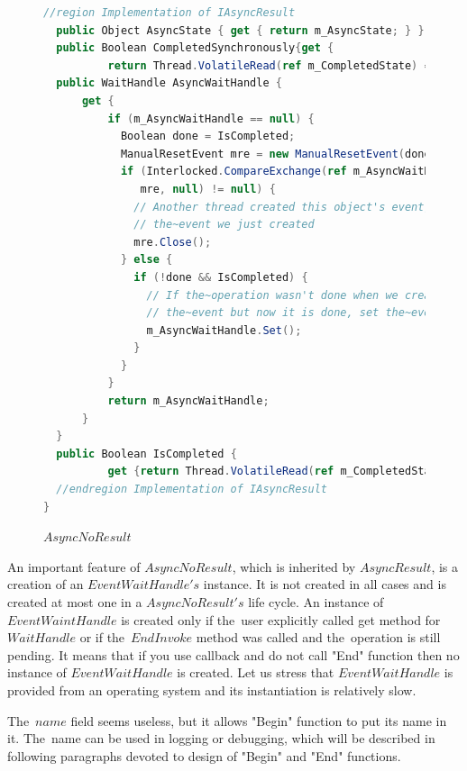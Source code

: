 \begin{figure}[!hbp]
\begin{lstlisting}[language=cs]
  //region Implementation of IAsyncResult
  public Object AsyncState { get { return m_AsyncState; } }
  public Boolean CompletedSynchronously{get { 
          return Thread.VolatileRead(ref m_CompletedState) ==  ic_scs; }}
  public WaitHandle AsyncWaitHandle {
      get {
          if (m_AsyncWaitHandle == null) {
            Boolean done = IsCompleted;
            ManualResetEvent mre = new ManualResetEvent(done);
            if (Interlocked.CompareExchange(ref m_AsyncWaitHandle,
               mre, null) != null) {
              // Another thread created this object's event; dispose 
              // the~event we just created
              mre.Close();
            } else {
              if (!done && IsCompleted) {
                // If the~operation wasn't done when we created 
                // the~event but now it is done, set the~event
                m_AsyncWaitHandle.Set();
              }
            }
          }
          return m_AsyncWaitHandle;
      }
  }
  public Boolean IsCompleted {
          get {return Thread.VolatileRead(ref m_CompletedState) != c_sp; }}
  //endregion Implementation of IAsyncResult
}
\end{lstlisting}
\caption{$AsyncNoResult$} 
\label{noresult}
\end{figure}


  An important feature of $AsyncNoResult$, which is inherited by $AsyncResult$, is a creation of an $EventWaitHandle's$ instance.
  It is not created in all cases and is created at most one in a $AsyncNoResult's$ life cycle.
  An instance of $EventWaintHandle$ is created only if the~user explicitly called get method for $WaitHandle$ or
  if the~$EndInvoke$ method was called and the~operation is still pending.
  It means that if you use callback and do not call "End" function then no instance of $EventWaitHandle$ is created.
  Let us stress that $EventWaitHandle$ is provided from an operating system and its instantiation is relatively slow.

  The~$name$ field seems useless, but it allows "Begin" function to put its name in it. 
  The~name can be used in logging or debugging, 
  which will be described in following paragraphs devoted 
  to design of "Begin" and "End" functions.

